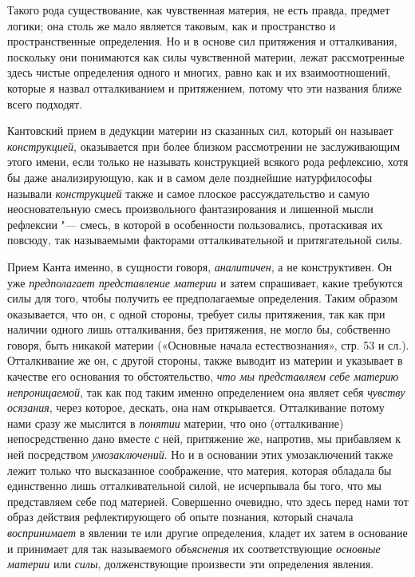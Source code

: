 Такого рода существование, как чувственная материя, не есть правда, предмет
логики; она столь же мало является таковым, как и пространство и
пространственные определения. Но и в основе сил притяжения и отталкивания,
поскольку они понимаются как силы чувственной материи, лежат рассмотренные
здесь чистые определения одного и многих, равно как и их взаимоотношений,
которые я назвал отталкиванием и притяжением, потому что эти названия ближе
всего подходят.

Кантовский прием в дедукции материи из сказанных сил, который он называет
{\em конструкцией}, оказывается при более близком
рассмотрении не заслуживающим этого имени, если только не называть
конструкцией всякого рода рефлексию, хотя бы даже анализирующую, как и в
самом деле позднейшие натурфилософы называли
{\em конструкцией} также и самое плоское
рассуждательство и самую неосновательную смесь произвольного фантазирования
и лишенной мысли рефлексии "--- смесь, в которой в особенности пользовались,
протаскивая их повсюду, так называемыми факторами отталкивательной и
притягательной силы.

Прием Канта именно, в сущности говоря, {\em аналитичен},
а не конструктивен. Он уже {\em предполагает
представление материи} и затем спрашивает, какие требуются силы для того,
чтобы получить ее предполагаемые определения. Таким образом оказывается,
что он, с одной стороны, требует силы притяжения, так как при наличии
одного лишь отталкивания, без притяжения, не могло бы, собственно говоря,
быть никакой материи («Основные начала естествознания», стр. 53 и сл.).
Отталкивание же он, с другой стороны, также выводит из материи и указывает
в качестве его основания то обстоятельство, {\em что мы
представляем себе материю непроницаемой}, так как под таким именно
определением она являет себя {\em чувству осязания},
через которое, дескать, она нам открывается. Отталкивание потому нами сразу
же мыслится в {\em понятии} материи, что оно
(отталкивание) непосредственно дано вместе с ней, притяжение же, напротив,
мы прибавляем к ней посредством {\em умозаключений}. Но
и в основании этих умозаключений также лежит только что высказанное
соображение, что материя, которая обладала бы единственно лишь
отталкивательной силой, не исчерпывала бы того, что мы представляем себе
под материей. Совершенно очевидно, что здесь перед нами тот образ действия
рефлектирующего об опыте познания, который сначала
{\em воспринимает} в явлении те или другие определения,
кладет их затем в основание и принимает для так называемого
{\em объяснения} их соответствующие
{\em основные материи} или
{\em силы}, долженствующие произвести эти определения
явления.

